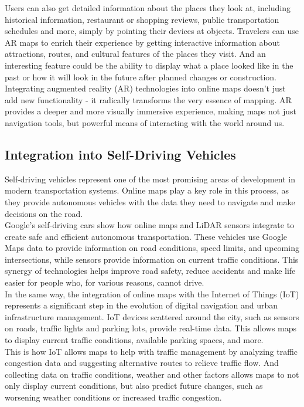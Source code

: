 \documentclass[10pt,oneside,english,a4paper]{article}
\begin{document}
Users can also get detailed information about the places they look at, including historical information, restaurant or shopping reviews, public transportation schedules and more, simply by pointing their devices at objects. Travelers can use AR maps to enrich their experience by getting interactive information about attractions, routes, and cultural features of the places they visit. And an interesting feature could be the ability to display what a place looked like in the past or how it will look in the future after planned changes or construction.
\\Integrating augmented reality (AR) technologies into online maps doesn't just add new functionality - it radically transforms the very essence of mapping. AR provides a deeper and more visually immersive experience, making maps not just navigation tools, but powerful means of interacting with the world around us.

\subsection{Integration into Self-Driving Vehicles} \label{future:vehicles}
Self-driving vehicles represent one of the most promising areas of development in modern transportation systems. Online maps play a key role in this process, as they provide autonomous vehicles with the data they need to navigate and make decisions on the road.
\\Google's self-driving cars \cite{NovakSelfDriving} show how online maps and LiDAR sensors integrate to create safe and efficient autonomous transportation. These vehicles use Google Maps data to provide information on road conditions, speed limits, and upcoming intersections, while sensors provide information on current traffic conditions. This synergy of technologies helps improve road safety, reduce accidents and make life easier for people who, for various reasons, cannot drive.
\\In the same way, the integration of online maps with the Internet of Things (IoT) represents a significant step in the evolution of digital navigation and urban infrastructure management. IoT devices scattered around the city, such as sensors on roads, traffic lights and parking lots, provide real-time data. This allows maps to display current traffic conditions, available parking spaces, and more. 
\\This is how IoT allows maps to help with traffic management by analyzing traffic congestion data and suggesting alternative routes to relieve traffic flow. And collecting data on traffic conditions, weather and other factors allows maps to not only display current conditions, but also predict future changes, such as worsening weather conditions or increased traffic congestion.
\end{document}
